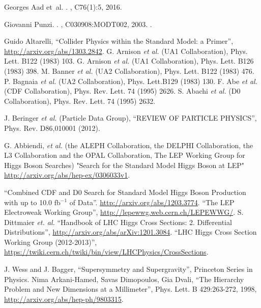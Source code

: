 \begin{thebibliography}{99}
Georges Aad et~al.
.
, C76(1):5, 2016.




Giovanni Punzi.
.
, C030908:MODT002, 2003.
\newblock [,79(2003)].






 Guido Altarelli, ``Collider Physics within the Standard Model: a Primer'', \url{http://arxiv.org/abs/1303.2842}.
 G. Arnison {\it et al.} (UA1 Collaboration), Phys. Lett. B122 (1983) 103.
 G. Arnison {\it et al.} (UA1 Collaboration), Phys. Lett. B126 (1983) 398.
 M. Banner {\it et al.} (UA2 Collaboration), Phys. Lett. B122 (1983) 476.
 P. Bagnaia {\it et al.} (UA2 Collaboration), Phys. Lett.B129 (1983) 130. 
 F. Abe {\it et al.} (CDF Collaboration), Phys. Rev. Lett. 74 (1995) 2626.
  S. Abachi {\it et al.} (D0 Collaboration), Phys. Rev. Lett. 74 (1995) 2632.

 J. Beringer {\it et al.} (Particle Data Group), ``REVIEW OF PARTICLE PHYSICS'', Phys. Rev. D86,010001 (2012).

 G. Abbiendi, {\it et al.} (the ALEPH Collaboration, the DELPHI Collaboration, the L3 Collaboration and the OPAL Collaboration, The LEP Working Group for Higgs Boson Searches) "Search for the Standard Model Higgs Boson at LEP" {\url{http://arxiv.org/abs/hep-ex/0306033v1}}.

 ``Combined CDF and D0 Search for Standard Model Higgs Boson Production with up to 10.0 fb$^{-1}$ of Data''. {\url{ http://arxiv.org/abs/1203.3774}}.
 ``The LEP Electroweak Working Group'', {\url {http://lepewwg.web.cern.ch/LEPEWWG/}}.
  S. Dittmaier {\it et. al.} ``Handbook of LHC Higgs Cross Sections: 2. Differential Distributions'', \url{http://arxiv.org/abs/arXiv:1201.3084}. 
 ``LHC Higgs Cross Section Working Group (2012-2013)'', {\url {https://twiki.cern.ch/twiki/bin/view/LHCPhysics/CrossSections}}.

 J. Wess and J. Bagger, ``Supersymmetry and Supergravity'', Princeton Series in Physics.
 Nima Arkani-Hamed, Savas Dimopoulos, Gia Dvali, ``The Hierarchy Problem and New Dimensions at a Millimeter'', Phys. Lett. B 429:263-272, 1998, \url{http://arxiv.org/abs/hep-ph/9803315}.


\end{thebibliography}
